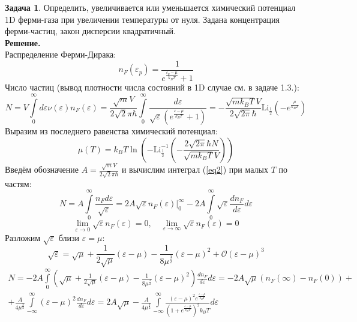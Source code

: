 \documentclass[12pt]{article}
\theoremstyle{definition}
\newtheorem{zad}{Задача}[section]
\begin{document}
\begin{zad}
Определить, увеличивается или уменьшается химический потенциал 1D ферми-газа при увеличении температуры от нуля. Задана концентрация ферми-частиц, закон дисперсии квадратичный.\\
\textbf{Решение.}\\
Распределение Ферми-Дирака:
\begin{equation}
    n_F(\varepsilon_p)=\frac{1}{e^{\frac{\varepsilon_p-\mu}{k_BT}}+1}
\end{equation}
Число частиц (вывод плотности числа состояний в 1D случае см. в задаче 1.3.):
\begin{equation}\label{eq2}
    N=V\int\limits_0^\infty d\varepsilon\nu(\varepsilon)n_F(\varepsilon)=\frac{\sqrt{m}V}{2\sqrt{2}\pi\hbar}\int\limits_0^\infty\frac{d\varepsilon}{\sqrt{\varepsilon}\left(e^{\frac{\varepsilon-\mu}{k_BT}}+1\right)}=-\frac{\sqrt{mk_BT}V}{2\sqrt{2\pi}\hbar}\text{Li}_\frac{1}{2}\left(-e^\frac{\mu}{k_BT}\right)
\end{equation}
Выразим из последнего равенства химический потенциал:
\begin{equation}
    \boxed{\mu(T)=k_BT\ln\left(-\text{Li}^{-1}_\frac{1}{2}\left(-\frac{2\sqrt{2\pi}\hbar N}{\sqrt{mk_BT}V}\right)\right)}
\end{equation}
Введём обозначение $A=\frac{\sqrt{m}V}{2\sqrt{2}\pi\hbar}$ и вычислим интеграл (\ref{eq2}) при малых $T$ по частям:
\begin{equation}
    N=A\int\limits_0^\infty\frac{n_Fd\varepsilon}{\sqrt{\varepsilon}}=2A\sqrt{\varepsilon}n_F(\varepsilon)\Bigg|_0^\infty-2A\int\limits_0^\infty\sqrt{\varepsilon}\frac{dn_F}{d\varepsilon}d\varepsilon
\end{equation}
\begin{equation}
    \lim\limits_{\varepsilon\rightarrow0}\sqrt{\varepsilon}n_F(\varepsilon)=0,\quad\lim\limits_{\varepsilon\rightarrow\infty}\sqrt{\varepsilon}n_F(\varepsilon)=0
\end{equation}
Разложим $\sqrt{\varepsilon}$ близи $\varepsilon=\mu$:
\begin{equation}
    \sqrt{\varepsilon}=\sqrt{\mu}+\frac{1}{2\sqrt{\mu}}(\varepsilon-\mu)-\frac{1}{8\mu^\frac{3}{2}}(\varepsilon-\mu)^2+\mathcal{O}(\varepsilon-\mu)^3
\end{equation}
\begin{multline}
    N=-2A\int\limits_0^\infty\left(\sqrt{\mu}+\frac{1}{2\sqrt{\mu}}(\varepsilon-\mu)-\frac{1}{8\mu^\frac{3}{2}}(\varepsilon-\mu)^2\right)\frac{dn_F}{d\varepsilon}d\varepsilon=-2A\sqrt{\mu}(n_F(\infty)-n_F(0))+\\+\frac{A}{4\mu^\frac{3}{2}}\int\limits_{-\infty}^\infty(\varepsilon-\mu)^2\frac{dn_F}{d\varepsilon}d\varepsilon=2A\sqrt{\mu}-\frac{A}{4\mu^\frac{3}{2}}\int\limits_{-\infty}^\infty\frac{(\varepsilon-\mu)^2e^{\frac{\varepsilon-\mu}{k_BT}}}{\left(1+e^{\frac{\varepsilon-\mu}{k_BT}}\right)^2k_BT}d\varepsilon

\end{multline}
\end{zad}
\end{document}

